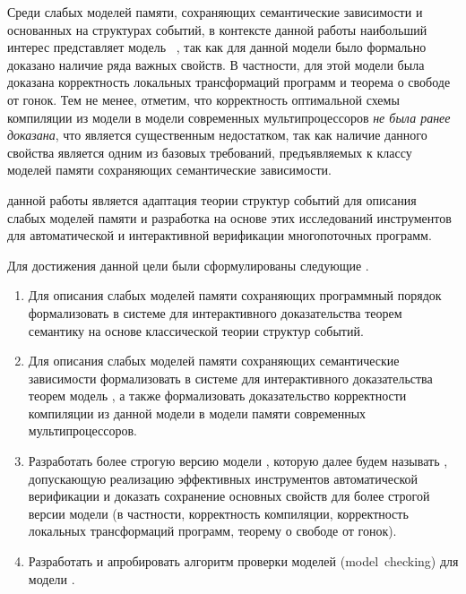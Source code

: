 Среди слабых моделей памяти, сохраняющих семантические зависимости
и основанных на структурах событий, в контексте данной работы наибольший интерес
представляет модель \Wkm~\autocite{Chakraborty-Vafeiadis:POPL19},
так как для данной модели было формально доказано наличие ряда важных свойств.
В частности, для этой модели была доказана корректность
локальных трансформаций программ и теорема о свободе от гонок.
Тем не менее, отметим, что корректность оптимальной схемы
компиляции из модели \Wkm в модели современных мультипроцессоров
\emph{не была ранее доказана}, что является существенным недостатком,
так как наличие данного свойства является одним из базовых требований,
предъявляемых к классу моделей памяти сохраняющих семантические зависимости.

{\aim} данной работы является адаптация теории структур событий
для описания слабых моделей памяти и разработка на основе этих исследований 
инструментов для автоматической и интерактивной верификации многопоточных программ. 

Для достижения данной цели были сформулированы следующие {\tasks}.
\begin{enumerate}[beginpenalty=10000] %
  \item Для описания слабых моделей памяти сохраняющих программный порядок
    формализовать в системе для интерактивного доказательства теорем \coq
    семантику на основе классической теории структур событий. 
  \item Для описания слабых моделей памяти сохраняющих семантические зависимости
    формализовать в системе для интерактивного доказательства теорем \coq
    модель \Wkm, а также формализовать доказательство корректности компиляции
    из данной модели в модели памяти современных мультипроцессоров.
  \item Разработать более строгую версию модели \Wkm, которую далее будем называть \WkmS, 
    допускающую реализацию эффективных инструментов автоматической верификации
    и доказать сохранение основных свойств \Wkm для более строгой версии модели 
    (в частности, корректность компиляции, корректность локальных трансформаций программ, 
     теорему о свободе от гонок).
  \item Разработать и апробировать алгоритм проверки моделей (model~checking) для модели \WkmS.
\end{enumerate}

~\newline

{\methods}

